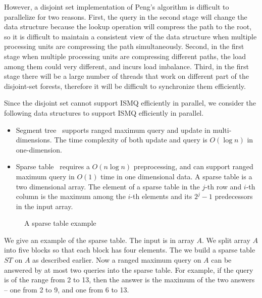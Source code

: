 
However, a disjoint set implementation of Peng's algorithm is difficult
to parallelize for two reasons.  First, the query in the second stage
will change the data structure because the lookup operation will
compress the path to the root, so it is difficult to maintain a
consistent view of the data structure when multiple processing units are
compressing the path simultaneously.  Second, in the first stage when
multiple processing units are compressing different paths, the load
among them could very different, and incurs load imbalance.  Third, in
the first stage there will be a large number of threads that work on
different part of the disjoint-set forests, therefore it will be
difficult to synchronize them efficiently.

Since the disjoint set cannot support ISMQ efficiently in parallel, we
consider the following data structures to support ISMQ efficiently in
parallel.

\begin{itemize}
  \item Segment tree~\cite{berg2000computational} supports ranged
    maximum query and update in multi-dimensions.  The time complexity
    of both update and query is $O(\log n)$ in one-dimension.
  \item Sparse table~\cite{Berkman1993RecursiveSP} requires a $O(n
    \log n)$ preprocessing, and can support ranged maximum query in
    $O(1)$ time in one dimensional data.  A sparse table is a two
    dimensional array.  The element of a sparse table in the $j$-th
    row and $i$-th column is the maximum among the $i$-th elements
    and its $2^j - 1$ predecessors in the input array.
\end{itemize}

\begin{figure}[!thb]
  \centering {} 
  \caption{A sparse table example}
  \label{fig:interval-decomposition}
\end{figure}

We give an example of the sparse table.  The input is in array $A$. We
split array $A$ into five blocks so that each block has four elements.
The we build a sparse table $ST$ on $A$ as described earlier.  Now a
ranged maximum query on $A$ can be answered by at most two queries
into the sparse table.  For example, if the query is of the range from
2 to 13, then the answer is the maximum of the two answers -- one from
2 to 9, and one from 6 to 13.

